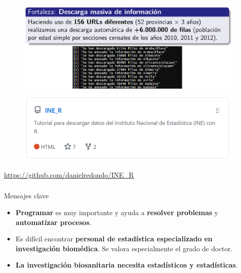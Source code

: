 \documentclass{beamer}
\begin{document}
\begin{frame}\frametitle{}
	\begin{figure}
		\centering
		\includegraphics[width=.9\textwidth]{images/INE_r2.png}
		\includegraphics[width=.7\textwidth]{images/INE_r3.png}
	\end{figure}
	\centering
	\url{https://github.com/danielredondo/INE_R}
\end{frame}



\begin{frame}\frametitle{}
	\begin{block}{Mensajes clave}
		\begin{itemize}
			\item \textbf{Programar} es muy importante y ayuda a \textbf{resolver problemas} y \textbf{automatizar procesos}.\\[2ex]
			\item Es difícil encontrar \textbf{personal de estadística especializado en investigación biomédica}. Se valora especialmente el grado de doctor.\\[2ex]
			\item \textbf{La investigación biosanitaria necesita estadísticos y estadísticas}.\\[2ex]
		\end{itemize}
	\end{block}
\end{frame}

\end{document}
